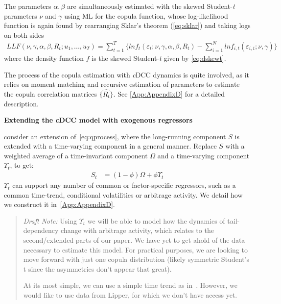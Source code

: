 The parameters $\alpha, \beta$ are simultaneously estimated with the skewed Student-\textit{t} parameters $\nu$ and $\gamma$ using ML for the copula function, whose log-likelihood function is again found by rearranging Sklar's theorem (\autoref{eq:sklar}) and taking logs on both sides
\begin{align} \label{eq:cdccllf}
    LLF(\nu, \gamma, \alpha, \beta, R_t; u_1, ..., u_T) = \sum^T_{t=1} \Big \{ ln f_t(\varepsilon_{t}; \nu, \gamma, \alpha, \beta, R_t) - \sum^N_{i = 1} ln f_{i,t}(\varepsilon_{i, t}; \nu, \gamma) \Big \}
\end{align}
where the density function $f$ is the skewed Student-\textit{t} given by \autoref{eq:dskewt}.

The process of the copula estimation with \textit{c}DCC dynamics is quite involved, as it relies on moment matching and recursive estimation of parameters to estimate the copula correlation matrices $\{\hat{R_t}\}$. See \autoref{App:AppendixD} for a detailed description.

\textbf{Extending the cDCC model with exogenous regressors}

\Textcite{ChristoffersenErrunzaJacobLanglois2012} consider an extension of~\eqref{eq:qprocess}, where the long-running component $S$ is extended with a time-varying component in a general manner. Replace $S$ with a weighted average of a time-invariant component $\Omega$ and a time-varying component $\Upsilon_t$, to get:
\begin{align}
    S_t &= (1 - \phi) \Omega + \phi \Upsilon_t
\end{align}
$\Upsilon_t$ can support any number of common or factor-specific regressors, such as a common time-trend, conditional volatilities or arbitrage activity. We detail how we construct it in~\autoref{App:AppendixD}.

\begin{quote}
    \textit{Draft Note:} Using $\Upsilon_t$ we will be able to model how the dynamics of tail-dependency change with arbitrage activity, which relates to the second/extended parts of our paper. We have yet to get ahold of the data necessary to estimate this model. For practical purposes, we are looking to move forward with just one copula distribution (likely symmetric Student's t since the asymmetries don't appear that great).

    At its most simple, we can use a simple time trend as in~\autocite{ChristoffersenErrunzaJacobLanglois2012}. However, we would like to use data from Lipper, for which we don't have access yet.
\end{quote}

